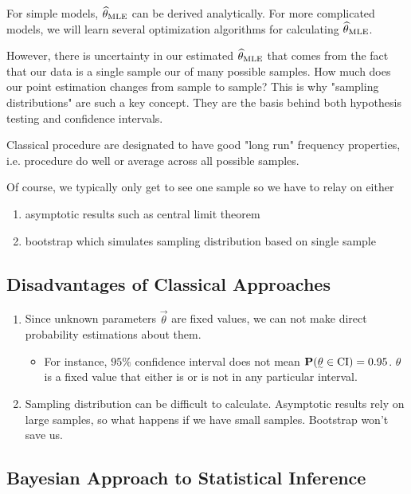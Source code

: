 For simple models, $\widehat{\theta}_{{\text{MLE}}}$ can be derived analytically. For more complicated models, we will learn several optimization algorithms for calculating $\widehat{\theta}_{\text{MLE}}$.

However, there is uncertainty in our estimated $\widehat{\theta}_{\text{MLE}}$ that comes from the fact that our data is a single sample our of many possible samples. How much does our point estimation changes from sample to sample? This is why "sampling distributions" are such a key concept. They are the basis behind both hypothesis testing and confidence intervals.

Classical procedure are designated to have good "long run" frequency properties, i.e. procedure do well or average across all possible samples.

Of course, we typically only get to see one sample so we have to relay on either
\begin{enumerate}
    \item asymptotic results such as central limit theorem
    \item bootstrap which simulates sampling distribution based on single sample
\end{enumerate}

\subsection{Disadvantages of Classical Approaches}
\begin{enumerate}
    \item Since unknown parameters $\vec{\theta}$ are fixed values, we can not make direct probability estimations about them.
    \begin{itemize}
        \item For instance, $95\%$ confidence interval does not mean $\P(\vec{\theta} \in \text{CI}) = 0.95$. $\theta$ is a fixed value that either is or is not in any particular interval.
    \end{itemize}
    \item Sampling distribution can be difficult to calculate. Asymptotic results rely on large samples, so what happens if we have small samples. Bootstrap won't save us.
\end{enumerate}

\subsection{Bayesian Approach to Statistical Inference}

